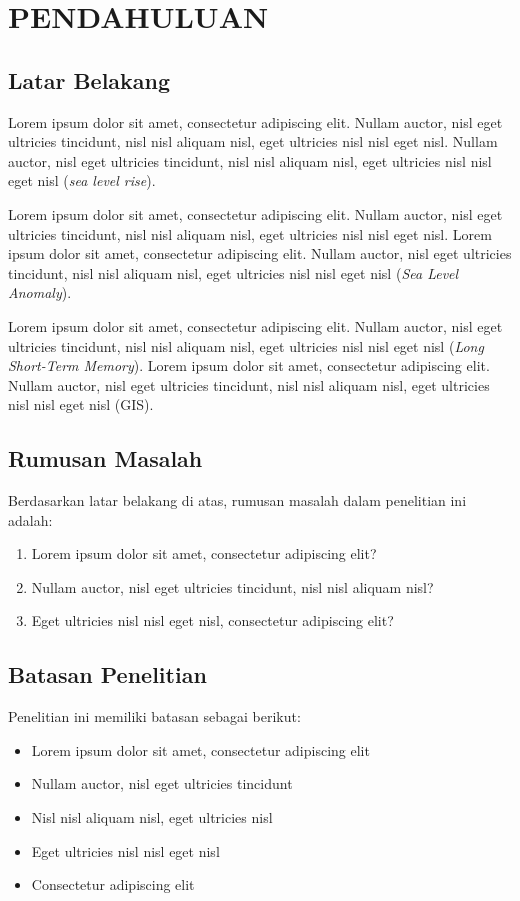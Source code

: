\chapter{PENDAHULUAN}

\section{Latar Belakang}
Lorem ipsum dolor sit amet, consectetur adipiscing elit. Nullam auctor, nisl eget ultricies tincidunt, nisl nisl aliquam nisl, eget ultricies nisl nisl eget nisl. Nullam auctor, nisl eget ultricies tincidunt, nisl nisl aliquam nisl, eget ultricies nisl nisl eget nisl (\textit{sea level rise}). 

Lorem ipsum dolor sit amet, consectetur adipiscing elit. Nullam auctor, nisl eget ultricies tincidunt, nisl nisl aliquam nisl, eget ultricies nisl nisl eget nisl. Lorem ipsum dolor sit amet, consectetur adipiscing elit. Nullam auctor, nisl eget ultricies tincidunt, nisl nisl aliquam nisl, eget ultricies nisl nisl eget nisl (\textit{Sea Level Anomaly}).

Lorem ipsum dolor sit amet, consectetur adipiscing elit. Nullam auctor, nisl eget ultricies tincidunt, nisl nisl aliquam nisl, eget ultricies nisl nisl eget nisl (\textit{Long Short-Term Memory}). Lorem ipsum dolor sit amet, consectetur adipiscing elit. Nullam auctor, nisl eget ultricies tincidunt, nisl nisl aliquam nisl, eget ultricies nisl nisl eget nisl (GIS).

\section{Rumusan Masalah}
Berdasarkan latar belakang di atas, rumusan masalah dalam penelitian ini adalah:
\begin{enumerate}
    \item Lorem ipsum dolor sit amet, consectetur adipiscing elit?
    \item Nullam auctor, nisl eget ultricies tincidunt, nisl nisl aliquam nisl?
    \item Eget ultricies nisl nisl eget nisl, consectetur adipiscing elit?
\end{enumerate}

\section{Batasan Penelitian}
Penelitian ini memiliki batasan sebagai berikut:
\begin{itemize}
    \item Lorem ipsum dolor sit amet, consectetur adipiscing elit
    \item Nullam auctor, nisl eget ultricies tincidunt
    \item Nisl nisl aliquam nisl, eget ultricies nisl
    \item Eget ultricies nisl nisl eget nisl
    \item Consectetur adipiscing elit
\end{itemize}

